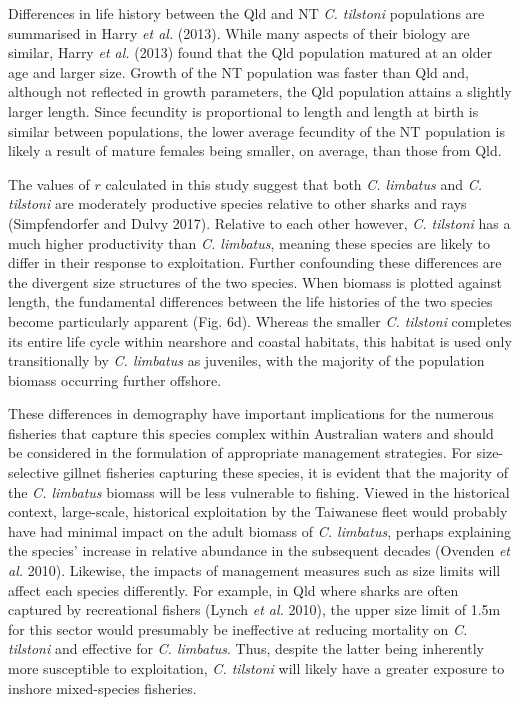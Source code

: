 \documentclass[]{article}
\begin{document}
Differences in life history between the Qld and NT \emph{C. tilstoni}
populations are summarised in Harry \emph{et al.} (2013). While many
aspects of their biology are similar, Harry \emph{et al.} (2013) found
that the Qld population matured at an older age and larger size. Growth
of the NT population was faster than Qld and, although not reflected in
growth parameters, the Qld population attains a slightly larger length.
Since fecundity is proportional to length and length at birth is similar
between populations, the lower average fecundity of the NT population is
likely a result of mature females being smaller, on average, than those
from Qld.

The values of \(r\) calculated in this study suggest that both \emph{C.
limbatus} and \emph{C. tilstoni} are moderately productive species
relative to other sharks and rays (Simpfendorfer and Dulvy 2017).
Relative to each other however, \emph{C. tilstoni} has a much higher
productivity than \emph{C. limbatus}, meaning these species are likely
to differ in their response to exploitation. Further confounding these
differences are the divergent size structures of the two species. When
biomass is plotted against length, the fundamental differences between
the life histories of the two species become particularly apparent (Fig.
6d). Whereas the smaller \emph{C. tilstoni} completes its entire life
cycle within nearshore and coastal habitats, this habitat is used only
transitionally by \emph{C. limbatus} as juveniles, with the majority of
the population biomass occurring further offshore.

These differences in demography have important implications for the
numerous fisheries that capture this species complex within Australian
waters and should be considered in the formulation of appropriate
management strategies. For size-selective gillnet fisheries capturing
these species, it is evident that the majority of the \emph{C. limbatus}
biomass will be less vulnerable to fishing. Viewed in the historical
context, large-scale, historical exploitation by the Taiwanese fleet
would probably have had minimal impact on the adult biomass of \emph{C.
limbatus}, perhaps explaining the species' increase in relative
abundance in the subsequent decades (Ovenden \emph{et al.} 2010).
Likewise, the impacts of management measures such as size limits will
affect each species differently. For example, in Qld where sharks are
often captured by recreational fishers (Lynch \emph{et al.} 2010), the
upper size limit of 1.5m for this sector would presumably be ineffective
at reducing mortality on \emph{C. tilstoni} and effective for \emph{C.
limbatus}. Thus, despite the latter being inherently more susceptible to
exploitation, \emph{C. tilstoni} will likely have a greater exposure to
inshore mixed-species fisheries.
\end{document}
